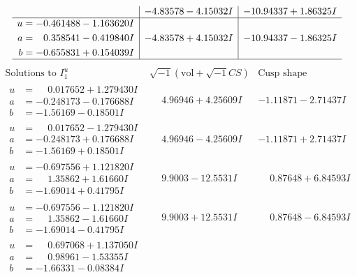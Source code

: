 \documentclass[1p]{elsarticle_modified}
\theoremstyle{definition}
\newcommand{\I}{\sqrt{-1}}
\begin{document}
$$\begin{array}{c|c|c}
 & -4.83578 - 4.15032 I & -10.94337 + 1.86325 I \\ \hline\begin{aligned}
u &= -0.461488 - 1.163620 I \\
a &= \phantom{-}0.358541 - 0.419840 I \\
b &= -0.655831 + 0.154039 I\end{aligned}
 & -4.83578 + 4.15032 I & -10.94337 - 1.86325 I\\
 \hline 
 \end{array}$$\newpage$$\begin{array}{c|c|c}  
\text{Solutions to }I^u_{1}& \I (\text{vol} + \sqrt{-1}CS) & \text{Cusp shape}\\
 \hline 
\begin{aligned}
u &= \phantom{-}0.017652 + 1.279430 I \\
a &= -0.248173 - 0.176688 I \\
b &= -1.56169 - 0.18501 I\end{aligned}
 & \phantom{-}4.96946 + 4.25609 I & -1.11871 - 2.71437 I \\ \hline\begin{aligned}
u &= \phantom{-}0.017652 - 1.279430 I \\
a &= -0.248173 + 0.176688 I \\
b &= -1.56169 + 0.18501 I\end{aligned}
 & \phantom{-}4.96946 - 4.25609 I & -1.11871 + 2.71437 I \\ \hline\begin{aligned}
u &= -0.697556 + 1.121820 I \\
a &= \phantom{-}1.35862 + 1.61660 I \\
b &= -1.69014 + 0.41795 I\end{aligned}
 & \phantom{-}9.9003 - 12.5531 I & \phantom{-}0.87648 + 6.84593 I \\ \hline\begin{aligned}
u &= -0.697556 - 1.121820 I \\
a &= \phantom{-}1.35862 - 1.61660 I \\
b &= -1.69014 - 0.41795 I\end{aligned}
 & \phantom{-}9.9003 + 12.5531 I & \phantom{-}0.87648 - 6.84593 I \\ \hline\begin{aligned}
u &= \phantom{-}0.697068 + 1.137050 I \\
a &= \phantom{-}0.98961 - 1.53355 I \\
b &= -1.66331 - 0.08384 I\end{aligned}

\end{array}$$
\end{document}
